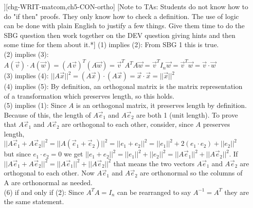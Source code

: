 \begin{SaveQuestion}
{\begin{itemize}
\end{itemize}}
][chg-WRIT-matcom,ch5-CON-ortho] %
    [Note to TAs: Students do not know how to do "if then" proofs. They only know how to check a definition. The use of logic can be done with plain English to justify a few things. Give them time to do the SBG question then work together on the DEV question giving hints and then some time for them about it.*]    %
    (1) implies (2):
From SBG 1 this is true. \\
(2) implies (3):
$A(\vec v) \cdot A(\vec w) = (A\vec v)^T(A\vec w) = \vec v ^T A^T A \vec w = \vec v ^T I_n \vec w = \vec v ^T \vec w = \vec v \cdot \vec w$ \\
(3) implies (4): $||A \vec x||^2 = (A\vec x) \cdot (A \vec x) = \vec x \cdot \vec x = ||\vec x||^2$ \\
(4) implies (5): By definition, an orthogonal matrix is the matrix representation of a transformation which preserves length, so this holds. \\
(5) implies (1): Since $A$ is an orthogonal matrix, it preserves length by definition. Because of this, the length of $A \vec e_1$ and $A \vec e_2$ are both 1 (unit length). To prove that $A \vec e_1$ and $A \vec e_2$ are orthogonal to each other, consider, since $A$ preserves length, 
$||A \vec e_1 + A\vec e_2||^2 = ||A(\vec e_1 + \vec e_2)||^2 = ||e_1 + e_2||^2 = ||e_1||^2 + 2(e_1 \cdot e_2) + ||e_2||^2$ but since $e_1 \cdot e_2 = 0$ we get $||e_1 + e_2||^2 = ||e_1||^2 + ||e_2||^2 = ||A \vec e_1||^2 + ||A \vec e_2||^2$. If $||A \vec e_1 + A \vec e_2||^2 = ||A \vec e_1||^2 + ||A \vec e_2||^2$ that means the two vectors $A \vec e_1$ and $A \vec e_2$ are orthogonal to each other. Now $A \vec e_1$ and $A \vec e_2$ are orthonormal so the columns of A are orthonormal as needed. \\
(6) if and only if (2): Since $A^TA=I_n$ can be rearranged to say $A^{-1}=A^T$ they are the same statement. 
\end{SaveQuestion}



